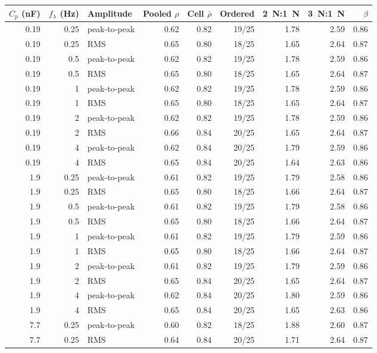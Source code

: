 \begin{tabular}{rr l rrrrrr}
\toprule
$C_p$ (\si{\nano\farad}) & $f_\lambda$ (\si{\hertz}) & Amplitude & Pooled $\rho$ & Cell $\bar\rho$ & Ordered & \SI{2}{\newton}:\SI{1}{\newton} & \SI{3}{\newton}:\SI{1}{\newton} & $\beta$ \\
\midrule
0.19 & 0.25 & peak-to-peak & 0.62 & 0.82 & 19/25 & 1.78 & 2.59 & 0.86 \\
0.19 & 0.25 & RMS & 0.65 & 0.80 & 18/25 & 1.65 & 2.64 & 0.87 \\
0.19 & 0.5 & peak-to-peak & 0.62 & 0.82 & 19/25 & 1.78 & 2.59 & 0.86 \\
0.19 & 0.5 & RMS & 0.65 & 0.80 & 18/25 & 1.65 & 2.64 & 0.87 \\
0.19 & 1 & peak-to-peak & 0.62 & 0.82 & 19/25 & 1.78 & 2.59 & 0.86 \\
0.19 & 1 & RMS & 0.65 & 0.80 & 18/25 & 1.65 & 2.64 & 0.87 \\
0.19 & 2 & peak-to-peak & 0.62 & 0.82 & 19/25 & 1.78 & 2.59 & 0.86 \\
0.19 & 2 & RMS & 0.66 & 0.84 & 20/25 & 1.65 & 2.64 & 0.87 \\
0.19 & 4 & peak-to-peak & 0.62 & 0.84 & 20/25 & 1.79 & 2.59 & 0.86 \\
0.19 & 4 & RMS & 0.65 & 0.84 & 20/25 & 1.64 & 2.63 & 0.86 \\
1.9 & 0.25 & peak-to-peak & 0.61 & 0.82 & 19/25 & 1.79 & 2.58 & 0.86 \\
1.9 & 0.25 & RMS & 0.65 & 0.80 & 18/25 & 1.66 & 2.64 & 0.87 \\
1.9 & 0.5 & peak-to-peak & 0.61 & 0.82 & 19/25 & 1.79 & 2.58 & 0.86 \\
1.9 & 0.5 & RMS & 0.65 & 0.80 & 18/25 & 1.66 & 2.64 & 0.87 \\
1.9 & 1 & peak-to-peak & 0.61 & 0.82 & 19/25 & 1.79 & 2.59 & 0.86 \\
1.9 & 1 & RMS & 0.65 & 0.80 & 18/25 & 1.66 & 2.64 & 0.87 \\
1.9 & 2 & peak-to-peak & 0.61 & 0.82 & 19/25 & 1.79 & 2.59 & 0.86 \\
1.9 & 2 & RMS & 0.65 & 0.84 & 20/25 & 1.65 & 2.64 & 0.87 \\
1.9 & 4 & peak-to-peak & 0.62 & 0.84 & 20/25 & 1.80 & 2.59 & 0.86 \\
1.9 & 4 & RMS & 0.65 & 0.84 & 20/25 & 1.65 & 2.63 & 0.86 \\
7.7 & 0.25 & peak-to-peak & 0.60 & 0.82 & 18/25 & 1.88 & 2.60 & 0.87 \\
7.7 & 0.25 & RMS & 0.64 & 0.84 & 20/25 & 1.71 & 2.64 & 0.87 \\

\end{tabular}
